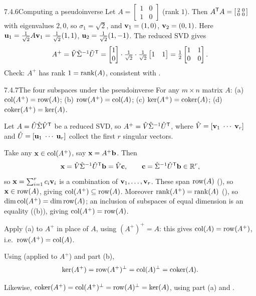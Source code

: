 \begin{exmp}{7.4.6}{Computing a pseudoinverse}
Let $A=\left[\begin{smallmatrix}1&0\\1&0\end{smallmatrix}\right]$ (rank $1$). Then $A^{\mathsf{T}} A=\left[\begin{smallmatrix}2&0\\0&0\end{smallmatrix}\right]$ with eigenvalues $2,0$, so $\sigma_1=\sqrt2$, and $\mathbf{v}_1=(1,0)$, $\mathbf{v}_2=(0,1)$. Here $\mathbf{u}_1=\tfrac1{\sqrt2}A\mathbf{v}_1=\tfrac1{\sqrt2}(1,1)$, $\mathbf{u}_2=\tfrac1{\sqrt2}(1,-1)$. The reduced SVD gives
\[
A^+=\tilde V\tilde\Sigma^{-1}\tilde U^{\mathsf{T}}=\begin{bmatrix}1\\0\end{bmatrix}\cdot\tfrac1{\sqrt2}\cdot\tfrac1{\sqrt2}\begin{bmatrix}1&1\end{bmatrix}=\tfrac12\begin{bmatrix}1&1\\0&0\end{bmatrix}.
\]
Check: $A^+$ has rank $1=\operatorname{rank}(A)$, consistent with .
\end{exmp}

\begin{thms}{7.4.7}{The four subspaces under the pseudoinverse}
For any $m\times n$ matrix $A$:
\textup{(a)} $\operatorname{col}(A^+)=\operatorname{row}(A)$;
\textup{(b)} $\operatorname{row}(A^+)=\operatorname{col}(A)$;
\textup{(c)} $\ker(A^+)=\operatorname{coker}(A)$;
\textup{(d)} $\operatorname{coker}(A^+)=\ker(A)$.
\end{thms}

\begin{prf}
Let $A=\hat U\hat\Sigma\hat V^{\mathsf{T}}$ be a reduced SVD, so $A^+=\hat V\hat\Sigma^{-1}\hat U^{\mathsf{T}}$, where $\hat V=[\mathbf{v}_1\;\cdots\;\mathbf{v}_r]$ and $\hat U=[\mathbf{u}_1\;\cdots\;\mathbf{u}_r]$ collect the first $r$ singular vectors.

 Take any $\mathbf{x}\in\operatorname{col}(A^+)$, say $\mathbf{x}=A^+\mathbf{b}$. Then
\[
\mathbf{x}=\hat V\hat\Sigma^{-1}\hat U^{\mathsf{T}}\mathbf{b}=\hat V\mathbf{c},\qquad \mathbf{c}=\hat\Sigma^{-1}\hat U^{\mathsf{T}}\mathbf{b}\in\mathbb{R}^r,
\]
so $\mathbf{x}=\sum_{i=1}^r c_i\mathbf{v}_i$ is a combination of $\mathbf{v}_1,\dots,\mathbf{v}_r$. These span $\operatorname{row}(A)$ (), so $\mathbf{x}\in\operatorname{row}(A)$, giving $\operatorname{col}(A^+)\subseteq\operatorname{row}(A)$. Moreover $\operatorname{rank}(A^+)=\operatorname{rank}(A)$ (), so $\operatorname{dim}\operatorname{col}(A^+)=\operatorname{dim}\operatorname{row}(A)$; an inclusion of subspaces of equal dimension is an equality ((b)), giving $\operatorname{col}(A^+)=\operatorname{row}(A)$.

 Apply (a) to $A^+$ in place of $A$, using $(A^+)^+=A$: this gives $\operatorname{col}(A)=\operatorname{row}(A^+)$, i.e.\ $\operatorname{row}(A^+)=\operatorname{col}(A)$.

 Using  (applied to $A^+$) and part (b),
\[
\ker(A^+)=\operatorname{row}(A^+)^\perp=\operatorname{col}(A)^\perp=\operatorname{coker}(A).
\]

 Likewise, $\operatorname{coker}(A^+)=\operatorname{col}(A^+)^\perp=\operatorname{row}(A)^\perp=\ker(A)$, using part (a) and .
\end{prf}

